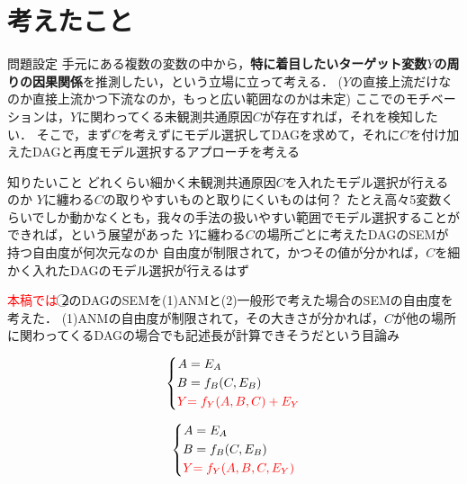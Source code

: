 \documentclass[dvipdfmx]{jsarticle}
\newcommand{\red}[1]{\textcolor{red}{#1}}
\begin{document}
\section{考えたこと}
\begin{outline}
\1 問題設定
   \2 手元にある複数の変数の中から，\textbf{特に着目したいターゲット変数$Y$の周りの因果関係}を推測したい，という立場に立って考える．
       \3 ($Y$の直接上流だけなのか直接上流かつ下流なのか，もっと広い範囲なのかは未定)
    \2 ここでのモチベーションは，$Y$に関わってくる未観測共通原因$C$が存在すれば，それを検知したい．
   \2 そこで，まず$C$を考えずにモデル選択してDAGを求めて，それに$C$を付け加えたDAGと再度モデル選択するアプローチを考える

\vspace{50mm}

\1 知りたいこと
   \2 どれくらい細かく未観測共通原因$C$を入れたモデル選択が行えるのか
      \3 $Y$に纏わる$C$の取りやすいものと取りにくいものは何？
      \3 たとえ高々5変数くらいでしか動かなくとも，我々の手法の扱いやすい範囲でモデル選択することができれば，という展望があった
    \2 $Y$に纏わる$C$の場所ごとに考えたDAGのSEMが持つ自由度が何次元なのか
        \3 自由度が制限されて，かつその値が分かれば，$C$を細かく入れたDAGのモデル選択が行えるはず

\1 \red{本稿では}
    \2 \textcircled{2}のDAGのSEMを(1)ANMと(2)一般形で考えた場合のSEMの自由度を考えた．
        \3 (1)ANMの自由度が制限されて，その大きさが分かれば，$C$が他の場所に関わってくるDAGの場合でも記述長が計算できそうだという目論み
\begin{figure}[htbp]
  \centering
  \begin{minipage}{0.4\textwidth}
    \begin{equation}
      \left\{
      \begin{aligned}
        A &= E_A \\
        B &= f_{B}(C, E_B) \\
        \red{Y} &\red{= f_{Y}(A, B, C) + E_Y}
      \end{aligned}
      \right.
    \end{equation}
  \end{minipage}
  \hspace{20mm}
  \begin{minipage}{0.4\textwidth}
    \begin{equation}
      \left\{
      \begin{aligned}
        A &= E_A \\
        B &= f_{B}(C, E_B) \\
        \red{Y} &\red{= f_{Y}(A, B, C,  E_Y)}
      \end{aligned}
      \right.
    \end{equation}
  \end{minipage}
\end{figure}
\end{outline}
\end{document}

